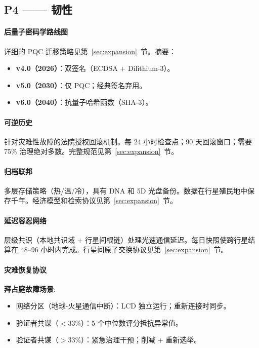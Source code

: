 \documentclass[11pt]{article}
\begin{document}
\subsection{P4 —— 韧性}
\label{sec:pillar-resilience}

\paragraph{后量子密码学路线图}
详细的 PQC 迁移策略见第~\ref{sec:expansion}~节。摘要：
\begin{itemize}[noitemsep]
  \item \textbf{v4.0（2026）}：双签名（ECDSA + Dilithium-3）。
  \item \textbf{v5.0（2030）}：仅 PQC；经典签名弃用。
  \item \textbf{v6.0（2040）}：抗量子哈希函数（SHA-3）。
\end{itemize}

\paragraph{可逆历史}
针对灾难性故障的法院授权回滚机制。每 24 小时检查点；90 天回滚窗口；需要 75\% 治理绝对多数。完整规范见第~\ref{sec:expansion}~节。

\paragraph{归档联邦}
多层存储策略（热/温/冷），具有 DNA 和 5D 光盘备份。数据在行星殖民地中保存千年。经济模型和检索协议见第~\ref{sec:expansion}~节。

\paragraph{延迟容忍网络}
层级共识（本地共识域 + 行星间根链）处理光速通信延迟。每日快照使跨行星结算在 48--96 小时内完成。行星间原子交换协议见第~\ref{sec:expansion}~节。

\paragraph{灾难恢复协议}
\textbf{拜占庭故障场景}:
\begin{itemize}[noitemsep]
  \item 网络分区（地球-火星通信中断）：LCD 独立运行；重新连接时同步。
  \item 验证者共谋（$<$33\%）：5 个中位数评分抵抗异常值。
  \item 验证者共谋（$>$33\%）：紧急治理干预；削减 + 重新选举。
\end{itemize}
\end{document}
